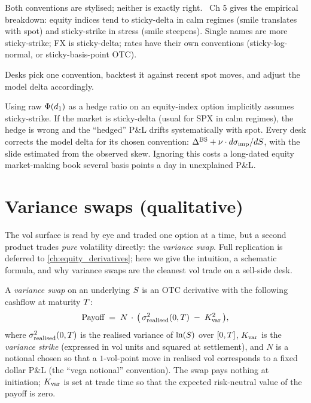 Both conventions are stylised; neither is exactly right.
 \citeBennett\ Ch 5 gives the
empirical breakdown: equity indices tend to sticky-delta in calm
regimes (smile translates with spot) and sticky-strike in stress
(smile steepens). Single names are more sticky-strike; FX is
sticky-delta; rates have their own conventions
(sticky-log-normal, or sticky-basis-point OTC).

Desks pick one convention, backtest it against recent spot moves,
and adjust the model delta accordingly.

\begin{pitfallbox}
Using raw $\Phi(d_1)$ as a hedge ratio on an equity-index option
implicitly assumes sticky-strike. If the market is sticky-delta
(usual for SPX in calm regimes), the hedge is wrong and the
``hedged'' P\&L drifts systematically with spot. Every desk
corrects the model delta for its chosen convention:
$\Delta^{\text{BS}} + \nu \cdot d\sigma_{\text{imp}}/dS$, with
the slide estimated from the observed skew. Ignoring this costs a
long-dated equity market-making book several basis points a day
in unexplained P\&L.
\end{pitfallbox}

\section{Variance swaps (qualitative)}
\label{sec:ch17_varswap}

The vol surface is read by eye and traded one option at a time,
but a second product trades \emph{pure} volatility directly: the
\emph{variance swap}. Full replication is deferred to
\cref{ch:equity_derivatives}; here we give the intuition, a
schematic formula, and why variance swaps are the cleanest vol
trade on a sell-side desk.

\begin{definition}
\label{def:varswap}
A \emph{variance swap} on an underlying $S$ is an OTC derivative
with the following cashflow at maturity $T$:
\begin{equation*}
  \text{Payoff} \;=\; N \,\cdot\, \bigl(\,\sigma_{\text{realised}}^2(0,T)
                      \;-\; K_{\text{var}}^2\,\bigr),
\end{equation*}
where $\sigma_{\text{realised}}^2(0,T)$ is the realised
variance of $\ln(S)$ over $[0,T]$, $K_{\text{var}}$
is the \emph{variance strike} (expressed in vol units and squared
at settlement), and $N$ is a notional chosen so that a
$1$-vol-point move in realised vol corresponds to a fixed dollar
P\&L (the ``vega notional'' convention). The swap pays nothing at
initiation; $K_{\text{var}}$ is set at trade time so that
the expected risk-neutral value of the payoff is zero.
\end{definition}

